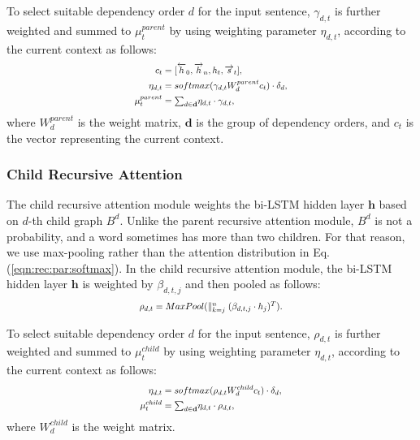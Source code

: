 \documentclass[letterpaper]{article} \usepackage{aaai20}  \usepackage{times}  \usepackage{helvet} \usepackage{courier}  \usepackage[hyphens]{url}  \usepackage{graphicx} \urlstyle{rm} \def\UrlFont{\rm}  \usepackage{graphicx}  \frenchspacing  \setlength{\pdfpagewidth}{8.5in}  \setlength{\pdfpageheight}{11in}  \usepackage{tabu}
\begin{document}
To select suitable dependency order $d$ for the input sentence, $\gamma_{d,t}$ is  further weighted and summed to $\mu^{parent}_{t}$ by using weighting parameter $\eta_{d,t}$, according to the current context as follows:
\begin{equation}
\scalebox{0.8}{$
\begin{aligned}
c_{t} &= [ \overleftarrow{h}_{0}, \overrightarrow{h}_{n}, h_{t}, \overrightarrow{s}_{t} ],\\
    \eta_{d,t} &= softmax(\gamma_{d,t}W^{parent}_{d}c_{t}) \cdot \delta_{d}, \\
    \mu^{parent}_{t} &= {\textstyle\sum}_{d \in \mathbf{d}}\eta_{d,t} \cdot \gamma_{d,t},
\label{eqn:rec:parent:order:softmax}
\end{aligned}
$}
\end{equation}
where $W^{parent}_{d}$ is the weight matrix, $\mathbf{d}$ is the group of dependency orders, and $c_{t}$ is the vector representing the current context.

\subsubsection{Child Recursive Attention}

The child recursive attention module weights the bi-LSTM hidden layer $\mathbf{h}$ based on $d$-th child graph $B^{d}$.
Unlike the parent recursive attention module, $B^{d}$ is not a probability, and a word sometimes has more than two children.
For that reason, we use max-pooling rather than the attention distribution in Eq.(\ref{eqn:rec:par:softmax}).
In the child recursive attention module, the bi-LSTM hidden layer $\mathbf{h}$ is weighted by $\beta_{d,t,j}$ and then pooled as follows:
\begin{equation}
\scalebox{0.8}{$
\rho_{d,t} = MaxPool(\parallel_{k=j}^{n} (\beta_{d,t,j} \cdot h_{j})^{T}).
$}
\end{equation}

To select suitable dependency order $d$ for the input sentence, $\rho_{d,t}$ is further weighted and summed to $\mu^{child}_{t}$ by using weighting parameter $\eta_{d,t}$, according to the current context as follows:
\begin{equation}
\scalebox{0.8}{$
\begin{aligned}
    \eta_{d,t} &= softmax(\rho_{d,t}W^{child}_{d}c_{t}) \cdot \delta_{d}, \\
    \mu^{child}_{t} &= {\textstyle\sum}_{d \in \mathbf{d}}\eta_{d,t} \cdot \rho_{d,t},
\label{eqn:rec:child:order:softmax}
\end{aligned}
$}
\end{equation}
where $W^{child}_{d}$ is the weight matrix.
\end{document}
